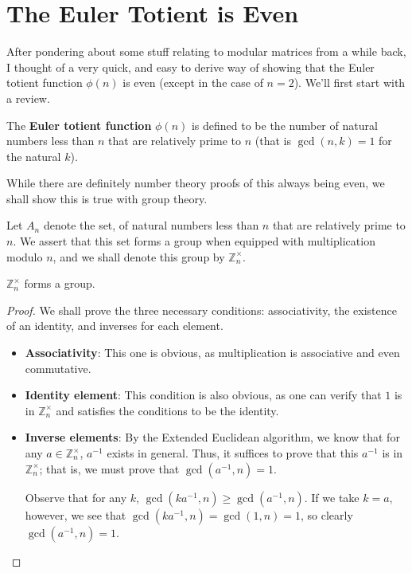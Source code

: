 \documentclass[a4paper, 12pt]{article}
\begin{document}
\section*{The Euler Totient is Even}

After pondering about some stuff relating to modular matrices from a while back, I thought of a very quick, and easy to derive way of showing that the Euler totient function \( \phi (n) \) is even (except in the case of \( n = 2 \)). We'll first start with a review.

\begin{sidebox}
    \begin{definition}
        The \textbf{Euler totient function} \( \phi(n) \) is defined to be the number of natural numbers less than \( n \) that are relatively prime to \( n \) (that is \( \gcd(n, k) = 1 \) for the natural \( k \)).
    \end{definition}
\end{sidebox}

While there are definitely number theory proofs of this always being even, we shall show this is true with group theory.

Let \( A_n \) denote the set, of natural numbers less than \( n \) that are relatively prime to \( n \). We assert that this set forms a group when equipped with multiplication modulo \( n \), and we shall denote this group by \( \mathbb{Z}_n^\times \).

\begin{sidebox}
    \begin{theorem}
        \( \mathbb{Z}_n^\times \) forms a group.
    \end{theorem}
\end{sidebox}

\begin{proof}
    We shall prove the three necessary conditions: associativity, the existence of an identity, and inverses for each element.
    \begin{itemize}
        \item \textbf{Associativity}: This one is obvious, as multiplication is associative and even commutative.
        \item \textbf{Identity element}: This condition is also obvious, as one can verify that \( 1 \) is in \( \mathbb{Z}_n^\times \) and satisfies the conditions to be the identity.
        \item \textbf{Inverse elements}: By the Extended Euclidean algorithm, we know that for any \( a \in \mathbb{Z}_n^\times \), \( a^{-1} \) exists in general. Thus, it suffices to prove that this \( a^{-1} \) is in \( \mathbb{Z}_n^\times \); that is, we must prove that \( \gcd(a^{-1}, n) = 1 \).

            Observe that for any \( k \), \( \gcd(ka^{-1}, n) \ge \gcd(a^{-1}, n) \). If we take \( k = a \), however, we see that \( \gcd(ka^{-1}, n) = \gcd(1, n) = 1 \), so clearly \( \gcd(a^{-1}, n) = 1 \).
    \end{itemize}
\end{proof}
\end{document}
